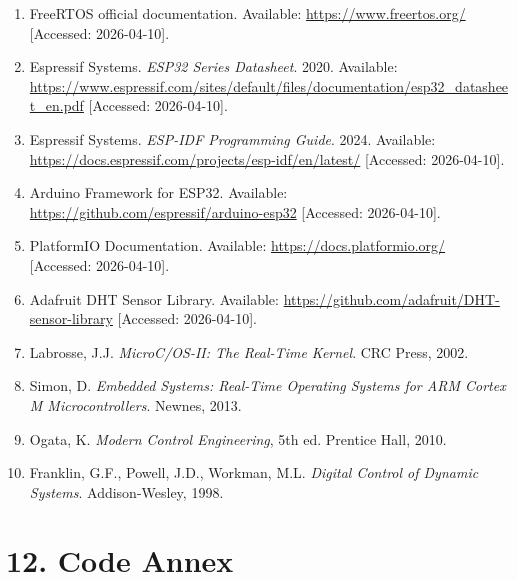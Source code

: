 \documentclass[12pt]{article}
\begin{document}
\begin{enumerate}
    \item FreeRTOS official documentation. Available:
          \url{https://www.freertos.org/} [Accessed: 2026-04-10].

    \item Espressif Systems. \textit{ESP32 Series Datasheet}. 2020. Available:
          \url{https://www.espressif.com/sites/default/files/documentation/esp32_datasheet_en.pdf}
          [Accessed: 2026-04-10].

    \item Espressif Systems. \textit{ESP-IDF Programming Guide}. 2024. Available:
          \url{https://docs.espressif.com/projects/esp-idf/en/latest/}
          [Accessed: 2026-04-10].

    \item Arduino Framework for ESP32. Available:
          \url{https://github.com/espressif/arduino-esp32} [Accessed: 2026-04-10].

    \item PlatformIO Documentation. Available: \url{https://docs.platformio.org/}
          [Accessed: 2026-04-10].

    \item Adafruit DHT Sensor Library. Available:
          \url{https://github.com/adafruit/DHT-sensor-library}
          [Accessed: 2026-04-10].

    \item Labrosse, J.J. \textit{MicroC/OS-II: The Real-Time Kernel}. CRC Press, 2002.

    \item Simon, D. \textit{Embedded Systems: Real-Time Operating Systems for ARM
          Cortex M Microcontrollers}. Newnes, 2013.

    \item Ogata, K. \textit{Modern Control Engineering}, 5th ed. Prentice Hall, 2010.

    \item Franklin, G.F., Powell, J.D., Workman, M.L.
          \textit{Digital Control of Dynamic Systems}. Addison-Wesley, 1998.
\end{enumerate}

\section*{12. Code Annex}
\end{document}
